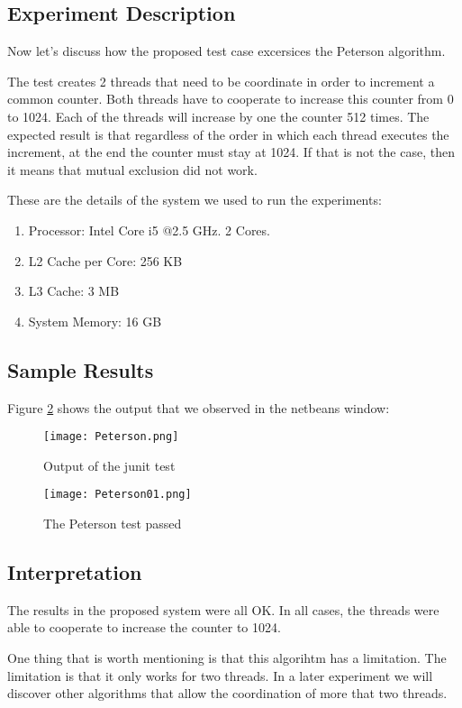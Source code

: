 \subsection{Experiment Description}
\par
 Now let's discuss how the proposed test case excersices the Peterson algorithm. 
 \par
 The test creates 2 threads that need to be coordinate in order to increment a
common counter. Both threads have to cooperate to increase this counter from 0
to 1024. Each of the threads will increase by one the counter 512 times. The
expected result is that regardless of the order in which each thread executes
the increment, at the end the counter must stay at 1024. If that is not the
case, then it means that mutual exclusion did not work.
\par
These are the details of the system we used to run the experiments:
\begin{enumerate}
\item Processor: Intel Core i5 @2.5 GHz. 2 Cores.
\item L2 Cache per Core: 256 KB
\item L3 Cache: 3 MB
\item System Memory: 16 GB
\end{enumerate}
\subsection{Sample Results}
\par
Figure \ref{fig:peterson} shows the output that we observed in the netbeans window:
\begin{figure}[h]
  \centering
  \texttt{[image: Peterson.png]}
  \caption{Output of the junit test}
  \label{fig:peterson}
\end{figure}
\par
\begin{figure}[h]
  \centering
  \texttt{[image: Peterson01.png]}
  \caption{The Peterson test passed}
  \label{fig:peterson}
\end{figure}
\subsection{Interpretation}
\par
The results in the proposed system were all OK. In all cases, the threads were
able to cooperate to increase the counter to 1024.
\par
One thing that is worth mentioning is that this algorihtm has a limitation. The
limitation is that it only works for two threads. In a later experiment we will
discover other algorithms that allow the coordination of more that two threads.
